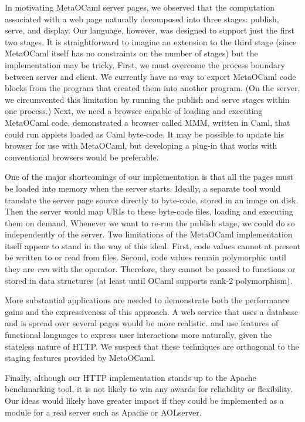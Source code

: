 \documentclass[preprint]{acm_proc_article-sp}
\def\MOC{MetaOCaml\xspace}
\begin{document}
In motivating \MOC server pages, we observed that the computation
associated with a web page naturally decomposed into three stages:
publish, serve, and display.  Our language, however, was designed to
support just the first two stages.  It is straightforward to imagine
an extension to the third stage (since \MOC itself has no constraints
on the number of stages) but the implementation may be tricky.  First,
we must overcome the process boundary between server and client.  We
currently have no way to export \MOC code blocks from the program that
created them into another program.  (On the server, we circumvented
this limitation by running the publish and serve stages within one
process.)  Next, we need a browser capable of loading and executing
\MOC code.  \citet{rouaix96web} demonstrated a browser called MMM,
written in Caml, that could run applets loaded as Caml byte-code.  It
may be possible to update his browser for use with \MOC, but
developing a plug-in that works with conventional browsers would be
preferable.


One of the major shortcomings of our implementation is that all the
pages must be loaded into memory when the server starts.  Ideally, a
separate tool would translate the server page source directly to
byte-code, stored in an image on disk.  Then the server would map URIs
to these byte-code files, loading and executing them on demand.
Whenever we want to re-run the publish stage, we could do so
independently of the server.  Two limitations of the \MOC
implementation itself appear to stand in the way of this ideal.
First, code values cannot at present be written to or read from files.
Second, code values remain polymorphic until they are \emph{run} with
the \Mrun{} operator.  Therefore, they cannot be passed to functions
or stored in data structures (at least until OCaml supports rank-2
polymorphism).

More substantial applications are needed to demonstrate both the
performance gains and the expressiveness of this approach.  A web
service that uses a database and is spread over several pages would be
more realistic.  \citet{queinnec00influence} and
\citet{graunke01programming} use features of functional languages to
express user interactions more naturally, given the stateless nature
of HTTP.  We suspect that these techniques are orthogonal to the
staging features provided by \MOC.

Finally, although our HTTP implementation stands up to the Apache
benchmarking tool, it is not likely to win any awards for reliability
or flexibility.  Our ideas would likely have greater impact if they
could be implemented as a module for a real server such as Apache or
AOLserver.
\end{document}
